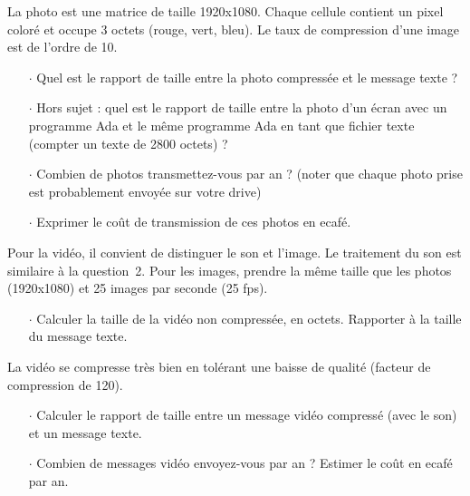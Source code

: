 La photo est une matrice de taille 1920x1080. Chaque cellule contient un pixel coloré et occupe 3 octets (rouge, vert, bleu).
Le taux de compression d'une image est de l'ordre de 10.

\begin{itemize}
\item[$\cdot$] Quel est le rapport de taille entre la photo compressée et le message texte ?
\item[$\cdot$] Hors sujet : quel est le rapport de taille entre la photo d'un écran avec un programme Ada et le même programme Ada en tant que fichier texte (compter un texte de 2800 octets) ?
\item[$\cdot$] Combien de photos transmettez-vous par an ? (noter que chaque photo prise est probablement envoyée sur votre drive)
\item[$\cdot$] Exprimer le coût de transmission de ces photos en ecafé.
\end{itemize}




Pour la vidéo, il convient de distinguer le son et l'image. Le traitement du son est similaire à la question~2. Pour les images,
prendre la même taille que les photos (1920x1080) et 25 images par seconde (25 fps).

\begin{itemize}
\item[$\cdot$] Calculer la taille de la vidéo non compressée, en octets. Rapporter à la taille du message texte.
\end{itemize}

La vidéo se compresse très bien en tolérant une baisse de qualité  (facteur de compression de 120).
%
\begin{itemize}
\item[$\cdot$] Calculer le rapport de taille entre un message vidéo compressé (avec le son) et un message texte.
\item[$\cdot$] Combien de messages vidéo envoyez-vous par an ? Estimer le coût en ecafé par an.
\end{itemize}

